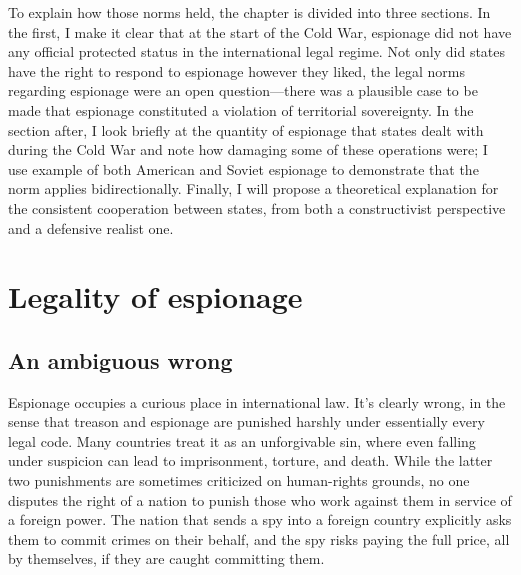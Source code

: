 \documentclass[11pt]{memoir}
\begin{document}
\begin{refsegment}
To explain how those norms held, the chapter is divided into three sections. In the first, I make it clear that at the start of the Cold War, espionage did not have any official protected status in the international legal regime. Not only did states have the right to respond to espionage however they liked, the legal norms regarding espionage were an open question---there was a plausible case to be made that espionage constituted a violation of territorial sovereignty. In the section after, I look briefly at the quantity of espionage that states dealt with during the Cold War and note how damaging some of these operations were; I use example of both American and Soviet espionage to demonstrate that the norm applies bidirectionally. Finally, I will propose a theoretical explanation for the consistent cooperation between states, from both a constructivist perspective and a defensive realist one.





\section{Legality of espionage}
\subsection{An ambiguous wrong}
Espionage occupies a curious place in international law. It's clearly wrong, in the sense that treason and espionage are punished harshly under essentially every legal code. Many countries treat it as an unforgivable sin, where even falling under suspicion can lead to imprisonment, torture, and death. While the latter two punishments are sometimes criticized on human-rights grounds, no one disputes the right of a nation to punish those who work against them in service of a foreign power. The nation that sends a spy into a foreign country explicitly asks them to commit crimes on their behalf, and the spy risks paying the full price, all by themselves, if they are caught committing them.


\end{refsegment}
\end{document}
